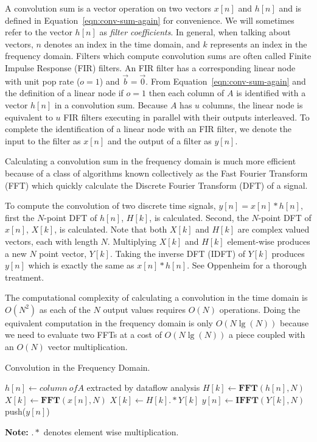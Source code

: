 A convolution sum is a vector operation on two vectors $x[n]$ and 
$h[n]$ and is defined in Equation~\ref{eqn:conv-sum-again} for
convenience. We will sometimes refer to the vector $h[n]$ as 
{\it filter coefficients}. In general, when talking about vectors, $n$ denotes 
an index in the time domain, and $k$ represents an index in the 
frequency domain. Filters which compute convolution sums are often called 
Finite Impulse Response (FIR) filters. An FIR filter has a corresponding linear 
node with unit pop rate ($o=1$) and ${\vec b} = {\vec 0}$. From 
Equation~\ref{eqn:conv-sum-again} and the definition of a linear node
if $o=1$ then each column of $A$ is identified with a vector $h[n]$
in a convolution sum. Because $A$ has $u$ columns,	
the linear node is equivalent to $u$ FIR filters 
executing in parallel with their outputs interleaved.
To complete the identification of a linear node with an FIR filter,
we denote the input to the filter as $x[n]$ and the output of
a filter as $y[n]$.

Calculating a convolution sum in the frequency domain is much
more efficient because of a class of algorithms known collectively as 
the Fast Fourier Transform (FFT) which quickly calculate 
the Discrete Fourier Transform (DFT) of a signal.

To compute the convolution of two discrete time signals, $y[n]=x[n]*h[n]$,
first the $N$-point DFT of $h[n]$, $H[k]$, is calculated.
Second, the $N$-point DFT of $x[n]$, $X[k]$, is calculated.
Note that both $X[k]$ and $H[k]$ are complex valued vectors, each with 
length $N$. Multiplying $X[k]$ and $H[k]$ element-wise produces a new $N$ point
vector, $Y[k]$. Taking the inverse DFT (IDFT) of $Y[k]$ produces 
$y[n]$ which is exactly the same as $x[n]*h[n]$. See Oppenheim
\cite{oppenheim-discrete} for a thorough treatment.

The computational complexity of calculating a convolution in the time domain
is $O(N^2)$ as each of the $N$ output values requires $O(N)$ operations.
Doing the equivalent computation in the frequency domain 
is only $O(N \lg(N))$ because we need to evaluate two FFTs at a cost of
$O(N \lg(N))$ a piece coupled with an $O(N)$ vector multiplication.

\begin{algorithm}
  \caption{Convolution in the Frequency Domain.\label{alg:freq-overview}}
  \begin{algorithmic}
    \STATE $h[n] \leftarrow {\mathit column~of}A$ extracted by dataflow analysis
    \STATE $H[k] \leftarrow \mathbf{FFT}(h[n],N)$ 
      \STATE $X[k] \leftarrow \mathbf{FFT}(x[n],N)$
      \STATE $X[k] \leftarrow H[k] .* Y[k]$ 
      \STATE $y[n] \leftarrow \mathbf{IFFT}(Y[k],N)$
      \STATE push($y[n]$)
    \ENDWHILE
  \end{algorithmic}
  {\bf Note:} $.*$ denotes element wise multiplication.
\end{algorithm}

